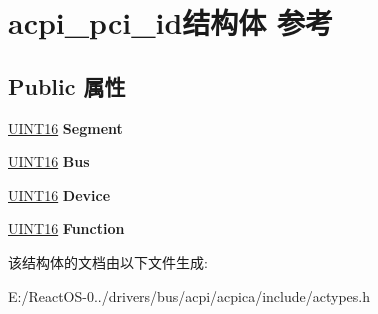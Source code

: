 \hypertarget{structacpi__pci__id}{}\section{acpi\+\_\+pci\+\_\+id结构体 参考}
\label{structacpi__pci__id}
\subsection*{Public 属性}
\begin{DoxyCompactItemize}
\item 
\mbox{\label{structacpi__pci__id_aa3d26e6633e92799ce41356fe9a7348e}} 
\hyperlink{_processor_bind_8h_a09f1a1fb2293e33483cc8d44aefb1eb1}{U\+I\+N\+T16} {\bfseries Segment}
\item 
\mbox{\label{structacpi__pci__id_aeafe64c106d4edf778b5248f23daa7aa}} 
\hyperlink{_processor_bind_8h_a09f1a1fb2293e33483cc8d44aefb1eb1}{U\+I\+N\+T16} {\bfseries Bus}
\item 
\mbox{\label{structacpi__pci__id_a317077afb4e6d7de66622a68b1e90329}} 
\hyperlink{_processor_bind_8h_a09f1a1fb2293e33483cc8d44aefb1eb1}{U\+I\+N\+T16} {\bfseries Device}
\item 
\mbox{\label{structacpi__pci__id_a940ee57590f60480771d8d5d2953f550}} 
\hyperlink{_processor_bind_8h_a09f1a1fb2293e33483cc8d44aefb1eb1}{U\+I\+N\+T16} {\bfseries Function}
\end{DoxyCompactItemize}


该结构体的文档由以下文件生成\+:\begin{DoxyCompactItemize}
\item 
E\+:/\+React\+O\+S-\/0../drivers/bus/acpi/acpica/include/actypes.\+h\end{DoxyCompactItemize}
